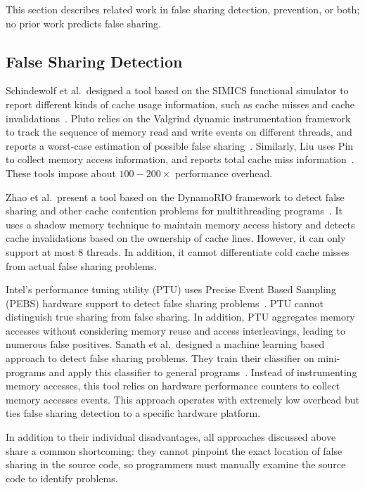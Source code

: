 \label{sec:relatedwork}

This section describes related work in false sharing detection, prevention, or both; no prior work predicts false sharing.

\subsection{False Sharing Detection}
Schindewolf et al.\ designed a tool based on the SIMICS functional simulator to report different kinds of cache usage information, such as cache misses and cache invalidations~\cite{falseshare:simulator}. Pluto relies on the Valgrind dynamic instrumentation framework to track the sequence of memory read and write events on different threads, and reports a worst-case estimation of possible false sharing~\cite{falseshare:binaryinstrumentation1}.
Similarly, Liu uses Pin to collect memory access information, and reports total cache miss information~\cite{falseshare:binaryinstrumentation2}.
These tools impose about $100-200\times$ performance overhead.

Zhao et al.\ present a tool based on the DynamoRIO framework to detect false sharing and other cache contention problems
for multithreading programs~\cite{qinzhaodetection}. 
It uses a shadow memory technique to maintain memory access history and detects cache invalidations based on the ownership of cache lines. However, it can only support at most $8$ threads. In addition, it cannot differentiate cold cache misses from actual false sharing problems.

Intel's performance tuning utility (PTU) uses Precise Event Based Sampling (PEBS) hardware support to detect false sharing problems~\cite{detect:ptu,detect:intel}.  PTU cannot distinguish true sharing from false sharing. In addition, PTU aggregates memory accesses without considering memory reuse and access interleavings, leading to numerous false positives. Sanath et al.\ designed a machine learning based approach to detect false sharing problems. They train their classifier on mini-programs and apply this classifier to general programs~\cite{mldetect}. Instead of instrumenting memory accesses, this tool relies on hardware performance counters to collect memory accesses events. This approach operates with extremely low overhead but ties false sharing detection to a specific hardware platform.

In addition to their individual disadvantages,
all approaches discussed above share a common shortcoming:  
they cannot pinpoint the exact location of false sharing in the source code, so programmers must manually examine the source code to identify problems.

